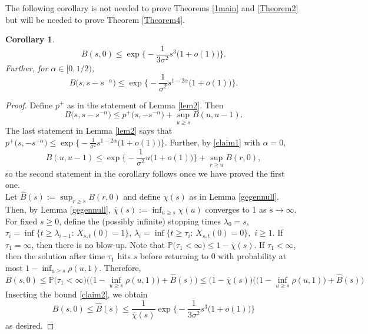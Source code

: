 \documentclass[sn-mathphys-num]{sn-jnl}
\newtheorem{cor}[thm]{Corollary}
\theoremstyle{definition}
\numberwithin{equation}{section} \theoremstyle{remark}
\def\P{\mathbb P}
\newcommand{\1}{\mathbbm{1}}
\renewcommand{\bar}{\overline}
\begin{document}
The following corollary is not needed to prove Theorems \ref{1main} and \ref{Theorem2} but will be needed to prove Theorem \ref{Theorem4}.


\begin{cor}\label{coneu}
   $$
B(s,0)\leq   \exp\Big\{-\frac 1{3\sigma^2}s^3\big(1+o(1)\big)\Big\}.
$$
Further, for $\alpha \in [0,1/2)$,
  $$
  B\big(s,s-s^{-\alpha}\big)\leq \exp\Big\{-\frac 1{\sigma^2}s^{1-2\alpha}\big(1+o(1)\big)\Big\}.
  $$
\end{cor}

\begin{proof}
  Define $p^+$ as in the statement of Lemma \ref{lem2}. Then
  $$
  B\big(s,s-s^{-\alpha}\big)\leq p^+\big(s,-s^{-\alpha}\big)+\sup_{u \geq s}B(u,u-1).
  $$
  The last statement in Lemma  \ref{lem2} says that $p^+\big(s,-s^{-\alpha}\big) \leq  \exp\Big\{-\frac 1{\sigma^2}s^{1-2\alpha}\big(1+o(1)\big)\Big\}$. Further, by \eqref{claim1} with $\alpha=0$,
  $$
B(u,u-1)\leq \exp\Big\{-\frac 1{\sigma^2}u   \big(1+o(1)\big) \Big\}+\sup_{r \geq u}B(r,0),
$$
so the second statement in the corollary follows once we have proved the first one.\\

Let $\hat B(s):=\sup_{r \geq s}B(r,0)$ and
define $\chi(s)$ as in Lemma \ref{gegennull}. Then, by Lemma  \ref{gegennull}, $\bar \chi(s):=\inf_{u \geq s}\chi(u)$ converges to 1 as $s \to \infty$. For fixed $s\geq 0$, define the (possibly infinite)
stopping times 
$\lambda_0=s$, $\tau_i=\inf\big\{t \geq \lambda_{i-1}:\,X_{s,t}(0)=1\big\}$, $\lambda_i=\inf\big\{t \geq \tau_i:\,X_{s,t}(0)=0\big\},$ $i \geq 1$. If $\tau_1=\infty$, then there is no blow-up. Note that
$\P\big(\tau_1<\infty\big)\leq 1-\bar \chi(s)$. 
If $\tau_1<\infty$, then the solution after time $\tau_1$ hits $s$ before returning to 0 with probability at most $1-\inf_{u \geq s}\rho(u,1)$. Therefore,   
$$
B(s,0)\leq\P\big(\tau_1<\infty\big) \Big(  \big(1-\inf_{u \geq s}\rho(u,1)\big) +\hat B(s) \Big) \leq   \big( 1-\bar \chi(s)\big)  \Big(  \big(1-\inf_{u \geq s}\rho(u,1)\big) +\hat B(s) \Big)
$$
Inserting the bound \eqref{claim2}, we obtain
$$
B(s,0) \leq \hat B(s) \leq \frac 1{\bar \chi(s)}\exp \Big\{-\frac 1{3\sigma^2}s^3\big(1+o(1)\big)\Big\}
$$
as desired.
\end{proof}
  
\end{document}
